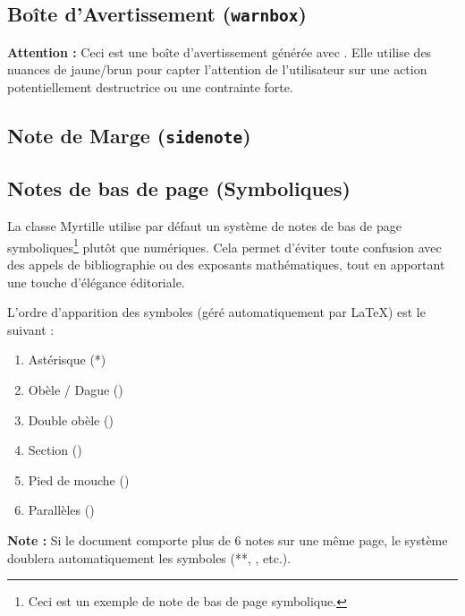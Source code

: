 \subsection{Boîte d'Avertissement (\texttt{warnbox})}
\begin{warnbox}
    \textbf{Attention :} Ceci est une boîte d'avertissement générée avec . Elle utilise des nuances de jaune/brun pour capter l'attention de l'utilisateur sur une action potentiellement destructrice ou une contrainte forte.
\end{warnbox}

\subsection{Note de Marge (\texttt{sidenote})}

\subsection{Notes de bas de page (Symboliques)}

La classe Myrtille utilise par défaut un système de notes de bas de page symboliques\footnote{Ceci est un exemple de note de bas de page symbolique.} plutôt que numériques. Cela permet d'éviter toute confusion avec des appels de bibliographie ou des exposants mathématiques, tout en apportant une touche d'élégance éditoriale.

L'ordre d'apparition des symboles (géré automatiquement par \LaTeX) est le suivant :

\begin{enumerate}
    \item Astérisque (*)
    \item Obèle / Dague (\textdagger)
    \item Double obèle (\textdaggerdbl)
    \item Section (\textsection)
    \item Pied de mouche (\textparagraph)
    \item Parallèles (\textbardbl)
\end{enumerate}

\textbf{Note :} Si le document comporte plus de 6 notes sur une même page, le système doublera automatiquement les symboles (**, \textdagger\textdagger, etc.).

